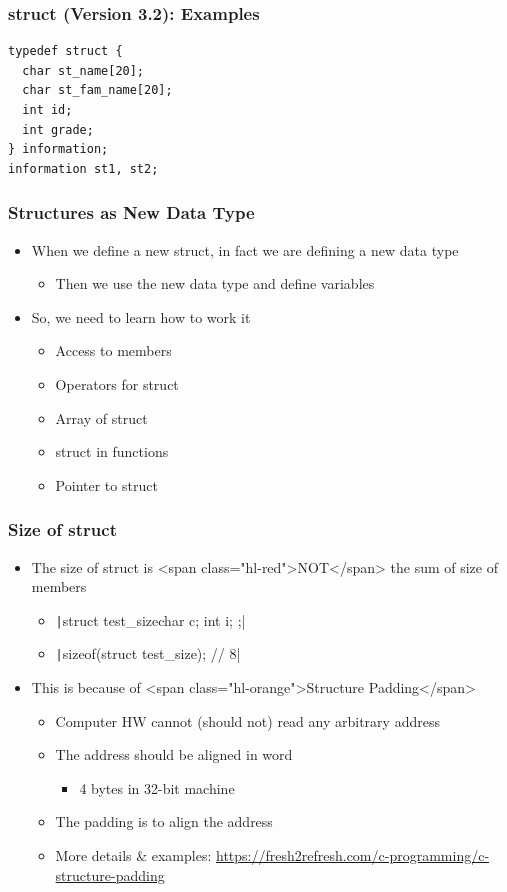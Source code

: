 \documentclass{../c-lecture}
\begin{document}
\begin{frame}[fragile]
  \frametitle{struct (Version 3.2): Examples}
  \begin{verbatim}
typedef struct {
  char st_name[20];
  char st_fam_name[20];
  int id;
  int grade;
} information;
information st1, st2;
  \end{verbatim}
\end{frame}

\begin{frame}
  \frametitle{Structures as New Data Type}
  \begin{itemize}
    \item
      When we define a new struct, in fact we are defining a new data type

    \begin{itemize}
      \item Then we use the new data type and define variables
    \end{itemize}
    \item So, we need to learn how to work it
    \begin{itemize}
      \item Access to members
      \item Operators for struct
      \item Array of struct
      \item struct in functions
      \item Pointer to struct
    \end{itemize}
  \end{itemize}
\end{frame}

\begin{frame}
  \frametitle{Size of struct}
  \begin{itemize}
    \item
      The size of struct is <span class="hl-red">NOT</span> the sum of size of
      members

    \begin{itemize}
      \item \texttt|struct test_size{char c; int i; };|
      \item \texttt|sizeof(struct test_size); // 8|
    \end{itemize}
    \item This is because of <span class="hl-orange">Structure Padding</span>
    \begin{itemize}
      \item Computer HW cannot (should not) read any arbitrary address
      \item The address should be aligned in word
      \begin{itemize}
        \item 4 bytes in 32-bit machine
      \end{itemize}
      \item The padding is to align the address
      \item
        More details \& examples:
        \href{Here}{https://fresh2refresh.com/c-programming/c-structure-padding}
    \end{itemize}
  \end{itemize}
\end{frame}
\end{document}
